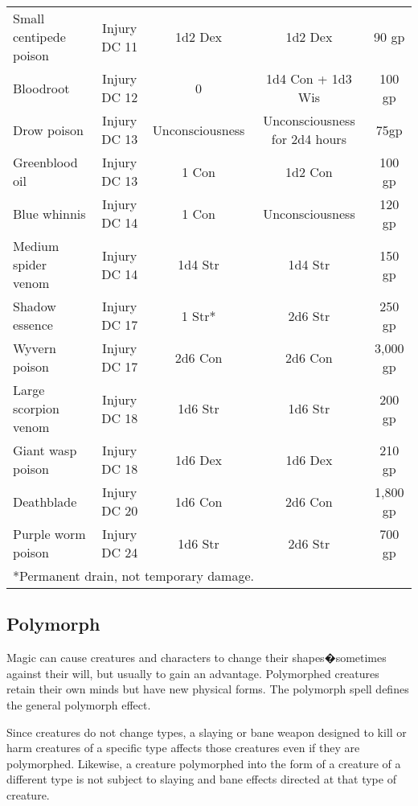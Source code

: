 \begin{table}
\begin{tabular}[h!]{l|cccc}
Small centipede poison & Injury DC 11  & 1d2 Dex        & 1d2 Dex                      & 90 gp    \\
Bloodroot              & Injury DC 12  & 0              & 1d4 Con + 1d3 Wis            & 100 gp   \\
Drow poison            & Injury DC 13  & Unconsciousness&	Unconsciousness for 2d4 hours& 75gp     \\
Greenblood oil         & Injury DC 13  & 1 Con          & 1d2 Con                      & 100 gp   \\
Blue whinnis           & Injury DC 14  & 1 Con          & Unconsciousness              & 120 gp   \\
Medium spider venom    & Injury DC 14  & 1d4 Str        & 1d4 Str                      & 150 gp   \\
Shadow essence         & Injury DC 17  & 1 Str*         & 2d6 Str                      & 250 gp   \\
Wyvern poison          & Injury DC 17	 & 2d6 Con        & 2d6 Con                      & 3,000 gp \\
Large scorpion venom   & Injury DC 18	 & 1d6 Str        & 1d6 Str                      & 200 gp   \\
Giant wasp poison      & Injury DC 18	 & 1d6 Dex        & 1d6 Dex                      & 210 gp   \\
Deathblade             & Injury DC 20  & 1d6 Con        & 2d6 Con                      & 1,800 gp \\
Purple worm poison     & Injury DC 24	 & 1d6 Str        & 2d6 Str                      & 700 gp   \\ \hline
\multicolumn{5}{p{7in}}{*Permanent drain, not temporary damage.} \\	 
\end{tabular}
\end{table}

\subsection{Polymorph}

Magic can cause creatures and characters to change their shapes�sometimes against their will, but usually to gain an advantage. Polymorphed creatures retain their own minds but have new physical forms.
The polymorph spell defines the general polymorph effect.

Since creatures do not change types, a slaying or bane weapon designed to kill or harm creatures of a specific type affects those creatures even if they are polymorphed. Likewise, a creature polymorphed into the form of a creature of a different type is not subject to slaying and bane effects directed at that type of creature. 

